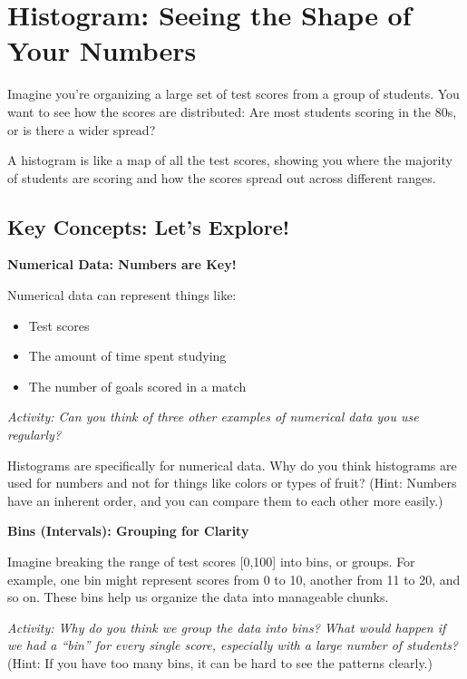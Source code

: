 \section{Histogram: Seeing the Shape of Your Numbers}

Imagine you’re organizing a large set of test scores from a group of students. You want to see how the scores are distributed: Are most students scoring in the 80s, or is there a wider spread?

A histogram is like a map of all the test scores, showing you where the majority of students are scoring and how the scores spread out across different ranges.

\subsection*{Key Concepts: Let’s Explore!}

\textbf{Numerical Data: Numbers are Key!}

Numerical data can represent things like: 
\begin{itemize}
    \item Test scores
    \item The amount of time spent studying
    \item The number of goals scored in a match
\end{itemize}

\textit{Activity: Can you think of three other examples of numerical data you use regularly?}

Histograms are specifically for numerical data. Why do you think histograms are used for numbers and not for things like colors or types of fruit? (Hint: Numbers have an inherent order, and you can compare them to each other more easily.) \newline

\noindent\textbf{Bins (Intervals): Grouping for Clarity}

Imagine breaking the range of test scores [0,100] into bins, or groups. For example, one bin might represent scores from 0 to 10, another from 11 to 20, and so on. These bins help us organize the data into manageable chunks. \newline

\textit{Activity: Why do you think we group the data into bins? What would happen if we had a “bin” for every single score, especially with a large number of students?} (Hint: If you have too many bins, it can be hard to see the patterns clearly.) \newline

